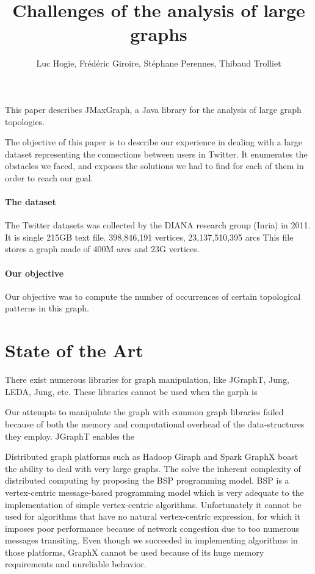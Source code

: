 \documentclass[11pt,a4paper]{article}
\title{Challenges of the analysis of large graphs}
\author{Luc Hogie, Frédéric Giroire, Stéphane Perennes, Thibaud Trolliet}
\begin{document}
\maketitle


This paper describes JMaxGraph, a Java library for the analysis of large graph topologies.





The objective of this paper is to describe our experience in dealing with
a large dataset representing the connections between users in Twitter. It enumerates the obstacles we faced, and exposes the solutions we had
to find for each of them in order to reach our goal.

\paragraph{The dataset}
{
The Twitter datasets was collected by the DIANA research group (Inria) in 2011. It is single 215GB text file. 
398,846,191 vertices, 23,137,510,395 arcs
This file stores a graph made of 400M arcs and 23G vertices. 
}

\paragraph{Our objective}
{
Our objective was to compute the number of occurrences of certain topological patterns in this graph.
}




\section{State of the Art}

There exist numerous libraries for graph manipulation, like JGraphT, Jung, LEDA, Jung, etc. These libraries cannot be used when the garph is


Our attempts to manipulate the graph with common graph libraries failed because  of both the memory and computational overhead of the data-structures they employ.
JGraphT enables the

Distributed graph platforms such as Hadoop Giraph and Spark GraphX boast the ability to deal with very large graphs.  The solve the inherent complexity of distributed computing by proposing the BSP programming model. BSP is a vertex-centric message-based programming model which is very adequate to the implementation of simple vertex-centric algorithms. Unfortunately it cannot be used for algorithms that have no natural vertex-centric expression, for which it imposes poor performance because of network congestion due to too numerous messages transiting.
Even though we succeeded in implementing algorithms in those platforms, GraphX cannot be used because of its huge memory requirements and unreliable behavior.
\end{document}
